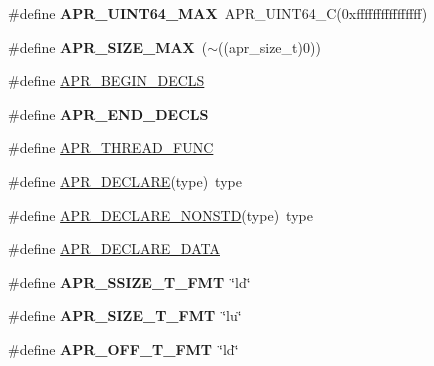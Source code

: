 \begin{DoxyCompactItemize}
\item 
\hypertarget{group__apr__platform_ga2d20379176b15b8b0598992df3def796}{\#define {\bfseries A\-P\-R\-\_\-\-U\-I\-N\-T64\-\_\-\-M\-A\-X}~A\-P\-R\-\_\-\-U\-I\-N\-T64\-\_\-\-C(0xffffffffffffffff)}\label{group__apr__platform_ga2d20379176b15b8b0598992df3def796}

\item 
\hypertarget{group__apr__platform_gab5865d64b134a3924014837dd44627a7}{\#define {\bfseries A\-P\-R\-\_\-\-S\-I\-Z\-E\-\_\-\-M\-A\-X}~($\sim$((apr\-\_\-size\-\_\-t)0))}\label{group__apr__platform_gab5865d64b134a3924014837dd44627a7}

\item 
\#define \hyperlink{group__apr__platform_gaa046c9c51a1af394db3a34dec1972630}{A\-P\-R\-\_\-\-B\-E\-G\-I\-N\-\_\-\-D\-E\-C\-L\-S}
\item 
\hypertarget{group__apr__platform_ga32d22bd9e118350c750a9c9c05bdeef8}{\#define {\bfseries A\-P\-R\-\_\-\-E\-N\-D\-\_\-\-D\-E\-C\-L\-S}}\label{group__apr__platform_ga32d22bd9e118350c750a9c9c05bdeef8}

\item 
\#define \hyperlink{group__apr__platform_gade8f829f9bd98fd4386894acf72edd7c}{A\-P\-R\-\_\-\-T\-H\-R\-E\-A\-D\-\_\-\-F\-U\-N\-C}
\item 
\#define \hyperlink{group__apr__platform_gad7b91b811a172bfa802603c2fb688f98}{A\-P\-R\-\_\-\-D\-E\-C\-L\-A\-R\-E}(type)~type
\item 
\#define \hyperlink{group__apr__platform_ga3ad5e45fabbda0ec5f106c334f1a0ae5}{A\-P\-R\-\_\-\-D\-E\-C\-L\-A\-R\-E\-\_\-\-N\-O\-N\-S\-T\-D}(type)~type
\item 
\#define \hyperlink{group__apr__platform_ga16a1a3d65c57ce052fffb63190b1cadc}{A\-P\-R\-\_\-\-D\-E\-C\-L\-A\-R\-E\-\_\-\-D\-A\-T\-A}
\item 
\hypertarget{group__apr__platform_gabac6108769f9b7deded82e73f3cd4060}{\#define {\bfseries A\-P\-R\-\_\-\-S\-S\-I\-Z\-E\-\_\-\-T\-\_\-\-F\-M\-T}~\char`\"{}ld\char`\"{}}\label{group__apr__platform_gabac6108769f9b7deded82e73f3cd4060}

\item 
\hypertarget{group__apr__platform_ga86928aa34fa77f8e7855d69050e3a27a}{\#define {\bfseries A\-P\-R\-\_\-\-S\-I\-Z\-E\-\_\-\-T\-\_\-\-F\-M\-T}~\char`\"{}lu\char`\"{}}\label{group__apr__platform_ga86928aa34fa77f8e7855d69050e3a27a}

\item 
\hypertarget{group__apr__platform_gad71d0d5a325d1aedeb6328d6bdacac76}{\#define {\bfseries A\-P\-R\-\_\-\-O\-F\-F\-\_\-\-T\-\_\-\-F\-M\-T}~\char`\"{}ld\char`\"{}}\label{group__apr__platform_gad71d0d5a325d1aedeb6328d6bdacac76}


\end{DoxyCompactItemize}
